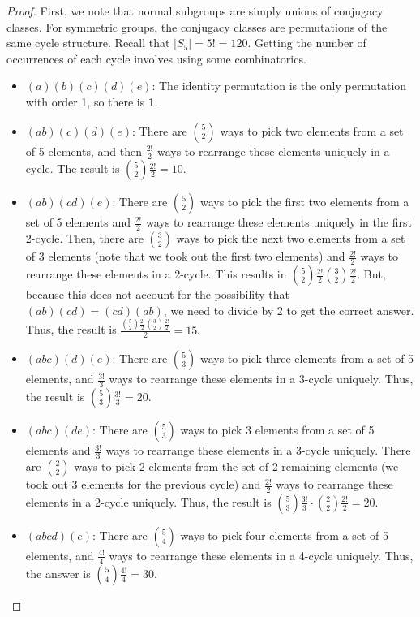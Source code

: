 \documentclass[letterpaper]{article}
\begin{document}
\begin{mdframed}
    \begin{proof}
        First, we note that normal subgroups are simply unions of conjugacy classes. For symmetric groups, the conjugacy classes are permutations of the same cycle structure. Recall that $|S_5| = 5! = 120$. Getting the number of occurrences of each cycle involves using some combinatorics. 
        \begin{itemize}
            \item \underline{$(a)(b)(c)(d)(e)$}: The identity permutation is the only permutation with order 1, so there is \textbf{1}. 
            \item \underline{$(ab)(c)(d)(e)$}: There are $\binom{5}{2}$ ways to pick two elements from a set of 5 elements, and then $\frac{2!}{2}$ ways to rearrange these elements uniquely in a cycle. The result is $\binom{5}{2} \frac{2!}{2} = 10$. 
            \item \underline{$(ab)(cd)(e)$}: There are $\binom{5}{2}$ ways to pick the first two elements from a set of 5 elements and $\frac{2!}{2}$ ways to rearrange these elements uniquely in the first 2-cycle. Then, there are $\binom{3}{2}$ ways to pick the next two elements from a set of 3 elements (note that we took out the first two elements) and $\frac{2!}{2}$ ways to rearrange these elements in a 2-cycle. This results in $\binom{5}{2} \frac{2!}{2} \binom{3}{2} \frac{2!}{2}$. But, because this does not account for the possibility that $(ab)(cd) = (cd)(ab)$, we need to divide by 2 to get the correct answer. Thus, the result is $\frac{\binom{5}{2} \frac{2!}{2} \binom{3}{2} \frac{2!}{2}}{2} = 15$.
            \item \underline{$(abc)(d)(e)$}: There are $\binom{5}{3}$ ways to pick three elements from a set of 5 elements, and $\frac{3!}{3}$ ways to rearrange these elements in a 3-cycle uniquely. Thus, the result is $\binom{5}{3} \frac{3!}{3} = 20$.
            \item \underline{$(abc)(de)$}: There are $\binom{5}{3}$ ways to pick 3 elements from a set of 5 elements and $\frac{3!}{3}$ ways to rearrange these elements in a 3-cycle uniquely. There are $\binom{2}{2}$ ways to pick 2 elements from the set of 2 remaining elements (we took out 3 elements for the previous cycle) and $\frac{2!}{2}$ ways to rearrange these elements in a 2-cycle uniquely. Thus, the result is $\binom{5}{3} \frac{3!}{3} \cdot \binom{2}{2} \frac{2!}{2} = 20$. 
            \item \underline{$(abcd)(e)$}: There are $\binom{5}{4}$ ways to pick four elements from a set of 5 elements, and $\frac{4!}{4}$ ways to rearrange these elements in a 4-cycle uniquely. Thus, the answer is $\binom{5}{4} \frac{4!}{4} = 30$.

\end{itemize}
\end{proof}
\end{mdframed}
\end{document}
